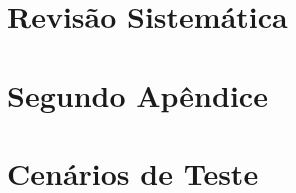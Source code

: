 \begin{apendicesenv}

\partapendices

\chapter{Revisão Sistemática}
\label{sec:revisão_sistemática}


\chapter{Segundo Apêndice}
\label{sec:desenvolvimento_prático}



\chapter{Cenários de Teste}
\label{sec:dados_cenarios_teste}



\end{apendicesenv}
